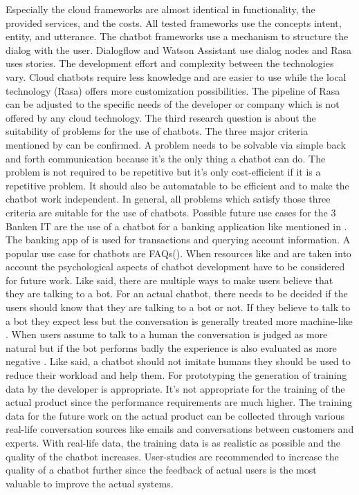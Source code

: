 Especially the cloud frameworks are almost identical in functionality, the provided services,
and the costs.
All tested frameworks use the concepts intent, entity, and utterance.
The chatbot frameworks use a mechanism to structure the dialog with the user.
Dialogflow and Watson Assistant use dialog nodes and Rasa uses stories.
The development effort and complexity between the technologies vary.
Cloud chatbots require less knowledge and are easier to use while the local technology (Rasa) 
offers more customization possibilities.
The pipeline of Rasa can be adjusted to the specific needs of the developer or company which 
is not offered by any cloud technology.
The third research question is about the suitability of problems for the use of chatbots.
The three major criteria mentioned by \citet{singhbuilding} can be confirmed.
A problem needs to be solvable via simple back and forth communication because it's the 
only thing a chatbot can do.
The problem is not required to be repetitive but it's only cost-efficient if it is 
a repetitive problem.
It should also be automatable to be efficient and to make the chatbot work independent.
In general, all problems which satisfy those three criteria are suitable for the use of chatbots.
Possible future use cases for the 3 Banken IT are the use of a chatbot for a banking
application like mentioned in \citet{singhbuilding}.
The banking app of \cite{singhbuilding} is used for transactions and querying account information.
A popular use case for chatbots are FAQs(\citet{evaluateChatbotsShawar2007, buiildChatbotsPython, huang2007extracting, GO2019304}).
When resources like \citet{} and \citet{} are taken into account the psychological aspects of 
chatbot development have to be considered for future work.
Like \citet{GO2019304} said, there are multiple ways to make users believe that they are talking to a bot.
For an actual chatbot, there needs to be decided if the users should know that they are talking to a bot or not.
If they believe to talk to a bot they expect less but the conversation is generally treated more machine-like \cite{GO2019304}.
When users assume to talk to a human the conversation is judged as more natural but if the bot performs badly the experience is also evaluated as more negative \cite{GO2019304}.
Like \citet{shawar2007chatbots} said, a chatbot should not imitate humans they should be used to reduce their workload and help them.
For prototyping the generation of training data by the developer is appropriate.
It's not appropriate for the training of the actual product since the performance
requirements are much higher.
The training data for the future work on the actual product can be collected through various
real-life conversation sources like emails and conversations between customers and experts.
With real-life data, the training data is as realistic as possible and the quality of the chatbot 
increases.
User-studies are recommended to increase the quality of a chatbot further since the feedback 
of actual users is the most valuable to improve the actual systems.